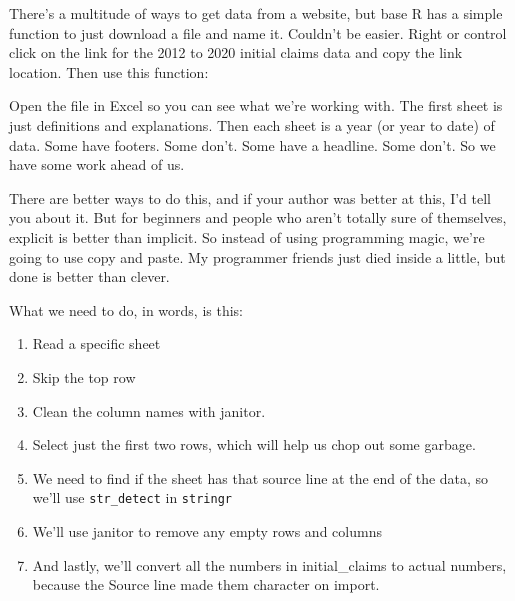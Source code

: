 \documentclass[]{book}
\newenvironment{Shaded}{\begin{snugshade}}{\end{snugshade}}
\newcommand{\DataTypeTok}[1]{\textcolor[rgb]{0.13,0.29,0.53}{#1}}
\newcommand{\KeywordTok}[1]{\textcolor[rgb]{0.13,0.29,0.53}{\textbf{#1}}}
\newcommand{\NormalTok}[1]{#1}
\newcommand{\StringTok}[1]{\textcolor[rgb]{0.31,0.60,0.02}{#1}}
\providecommand{\tightlist}{%
  \setlength{\itemsep}{0pt}\setlength{\parskip}{0pt}}
\begin{document}
There's a multitude of ways to get data from a website, but base R has a simple function to just download a file and name it. Couldn't be easier. Right or control click on the link for the 2012 to 2020 initial claims data and copy the link location. Then use this function:

\begin{Shaded}
\end{Shaded}

Open the file in Excel so you can see what we're working with. The first sheet is just definitions and explanations. Then each sheet is a year (or year to date) of data. Some have footers. Some don't. Some have a headline. Some don't. So we have some work ahead of us.

There are better ways to do this, and if your author was better at this, I'd tell you about it. But for beginners and people who aren't totally sure of themselves, explicit is better than implicit. So instead of using programming magic, we're going to use copy and paste. My programmer friends just died inside a little, but done is better than clever.

What we need to do, in words, is this:

\begin{enumerate}
\def\labelenumi{\arabic{enumi}.}
\tightlist
\item
  Read a specific sheet
\item
  Skip the top row
\item
  Clean the column names with janitor.
\item
  Select just the first two rows, which will help us chop out some garbage.
\item
  We need to find if the sheet has that source line at the end of the data, so we'll use \texttt{str\_detect} in \texttt{stringr}
\item
  We'll use janitor to remove any empty rows and columns
\item
  And lastly, we'll convert all the numbers in initial\_claims to actual numbers, because the Source line made them character on import.
\end{enumerate}
\end{document}
